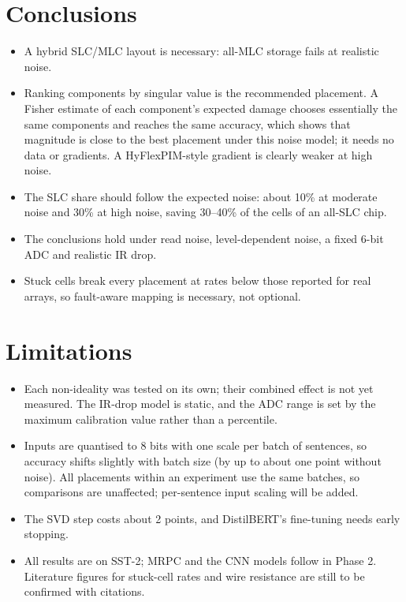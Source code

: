 \documentclass[10pt,a4paper]{article}
\begin{document}
\section{Conclusions}
\begin{itemize}
\item A hybrid SLC/MLC layout is necessary: all-MLC storage fails at realistic noise.
\item Ranking components by singular value is the recommended placement. A Fisher estimate of each
component's expected damage chooses essentially the same components and reaches the same accuracy, which
shows that magnitude is close to the best placement under this noise model; it needs no data or
gradients. A HyFlexPIM-style gradient is clearly weaker at high noise.
\item The SLC share should follow the expected noise: about 10\% at moderate noise and 30\% at high noise,
saving 30--40\% of the cells of an all-SLC chip.
\item The conclusions hold under read noise, level-dependent noise, a fixed 6-bit ADC and realistic IR drop.
\item Stuck cells break every placement at rates below those reported for real arrays, so fault-aware
mapping is necessary, not optional.
\end{itemize}

\section{Limitations}
\begin{itemize}
\item Each non-ideality was tested on its own; their combined effect is not yet measured. The IR-drop model
is static, and the ADC range is set by the maximum calibration value rather than a percentile.
\item Inputs are quantised to 8 bits with one scale per batch of sentences, so accuracy shifts slightly
with batch size (by up to about one point without noise). All placements within an experiment use the same
batches, so comparisons are unaffected; per-sentence input scaling will be added.
\item The SVD step costs about 2 points, and DistilBERT's fine-tuning needs early stopping.
\item All results are on SST-2; MRPC and the CNN models follow in Phase 2. Literature figures for stuck-cell
rates and wire resistance are still to be confirmed with citations.
\end{itemize}
\end{document}
